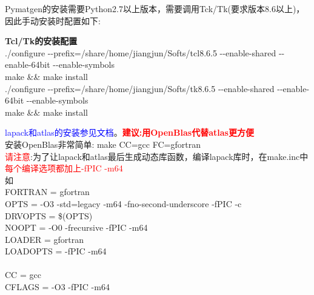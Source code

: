 \documentclass[10pt,a4paper]{article}
\begin{document}


\textrm{Pymatgen}的安装需要\textrm{Python}2.7以上版本，需要调用\textrm{Tck/Tk}(要求版本8.6以上)，因此手动安装时配置如下:

\textbf{Tcl/Tk的安装配置}\\
./configure -\/-prefix=/share/home/jiangjun/Softs/tcl8.6.5 -\/-enable-shared -\/-enable-64bit -\/-enable-symbols\\
make \&\& make install\\
./configure -\/-prefix=/share/home/jiangjun/Softs/tk8.6.5 -\/-enable-shared -\/-enable-64bit -\/-enable-symbols\\
make \&\& make install

\textcolor{blue}{\textrm{lapack}和\textrm{atlas}的安装参见文档}。\textcolor{red}{\textbf{建议:用OpenBlas代替atlas更方便}}\\
安装\textrm{OpenBlas}非常简单:\;\; \textrm{make CC=gcc FC=gfortran}\\

\textcolor{red}{请注意}:为了让\textrm{lapack}和\textrm{atlas}最后生成动态库函数，编译\textrm{lapack}库时，在\textrm{make.inc}中\textcolor{red}{每个编译选项都加上-fPIC -m64}\\
如\\
FORTRAN  = gfortran \\
OPTS     = -O3 -std=legacy -m64 -fno-second-underscore -fPIC -c\\
DRVOPTS  = \$(OPTS)\\
NOOPT    = -O0 -frecursive -fPIC -m64\\
LOADER   = gfortran \\
LOADOPTS = -fPIC -m64\\
\\
CC = gcc\\
CFLAGS = -O3 -fPIC -m64\\
\end{document}
